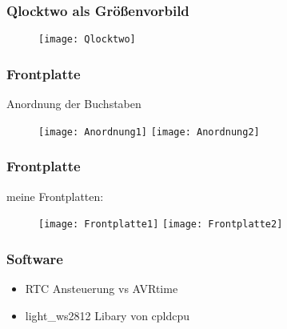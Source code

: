 \documentclass{beamer}
\begin{document}
\frame
{
  \frametitle{Qlocktwo als Größenvorbild}
\begin{figure}[tb]
\centering \texttt{[image: Qlocktwo]} 
\end{figure}
} 




 
 \frame
{
  \frametitle{Frontplatte}
  Anordnung der Buchstaben
  \begin{figure}
     \centering
     \texttt{[image: Anordnung1]}
     \texttt{[image: Anordnung2]}
\end{figure}
} 
 
\frame
{
  \frametitle{Frontplatte}
  meine Frontplatten:
  \begin{figure}
     \centering
     \texttt{[image: Frontplatte1]}
     \texttt{[image: Frontplatte2]}
\end{figure}
} 
 
 \frame
{
  \frametitle{Software}
  \begin{itemize}
\item RTC Ansteuerung vs AVRtime
\item light_ws2812 Libary von cpldcpu
\end{itemize}

} 
 
 
 
 
 
 
 
\end{document}
